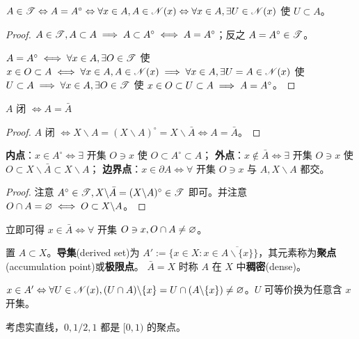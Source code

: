 \begin{theorem}
    $A\in\mathscr T\Leftrightarrow A=A^\circ\Leftrightarrow\forall x\in A,A\in\mathscr N(x)\Leftrightarrow\forall x\in A,\exists U\in\mathscr N(x)$ 使 $U\subset A$。
\end{theorem}

\begin{proof}
    $A\in\mathscr T,A\subset A\implies A\subset A^\circ\iff A=A^\circ$；反之 $A=A^\circ\in\mathscr T$。

    $A=A^\circ\iff\forall x\in A,\exists O\in\mathscr T$ 使 $x\in O\subset A\iff\forall x\in A, A\in\mathscr N(x)\implies \forall x\in A,\exists U=A\in\mathscr N(x)$ 使 $U\subset A\implies \forall x\in A,\exists O\in\mathscr T$ 使 $ x\in O\subset U\subset A \implies A=A^\circ$。
\end{proof}

\begin{theorem}
    $A$ 闭 $\iff A=\bar A$
\end{theorem}
\begin{proof}
    $A$ 闭 $\iff X\backslash A=(X\backslash A)^\circ=X\backslash\bar A\iff A=\bar A$。
\end{proof}

\begin{theorem}
    \textbf{内点}：$x\in A^\circ\iff\exists$ 开集 $O\ni x$ 使 $O\subset A^\circ\subset A$；
    \textbf{外点}：$x\notin \bar A\iff\exists$ 开集 $O\ni x$ 使 $O\subset X\backslash\bar A\subset X\backslash A$；
    \textbf{边界点}：$x\in\partial A\iff\forall$ 开集 $O\ni x$ 与 $A,X\backslash A$ 都交。
\end{theorem}
\begin{proof}
    注意 $A^\circ\in\mathscr T,X\backslash \bar A = (X\backslash A)^\circ\in\mathscr T$ 即可。并注意 $O\cap A=\varnothing\iff O\subset X\backslash A$。
\end{proof}

\begin{remark}
    立即可得 $x\in\bar A\iff\forall$ 开集 $O\ni x,O\cap A\ne\varnothing$。
\end{remark}

\begin{definition}
置 $A\subset X$。\textbf{导集}(derived set)为 $A':=\{x \in X:x\in\overline{A\backslash\{x\}}\}$，其元素称为\textbf{聚点}(accumulation point)或\textbf{极限点}。
$\bar{A}=X$ 时称 $A$ 在 $X$ 中\textbf{稠密}(dense)。
\end{definition}
\begin{remark}
    $x\in A'\Leftrightarrow \forall U\in\mathscr N(x),(U\cap A)\backslash\{x\}=U\cap (A\backslash\{x\})\ne\varnothing$。$U$ 可等价换为任意含 $x$ 开集。
\end{remark}
\begin{example}
    考虑实直线，$0,1/2,1$ 都是 $[0,1)$ 的聚点。
\end{example}

